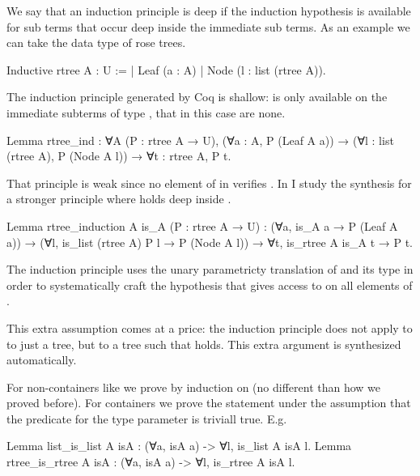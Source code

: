 \documentclass[a4paper, 11pt]{book}
\begin{document}
We say that an induction principle is deep if the induction hypothesis is
available for sub terms that occur deep inside the immediate sub terms.
As an example we can take the data type of rose trees.

\begin{coqcode}
Inductive rtree A : U :=
| Leaf (a : A)
| Node (l : list (rtree A)).
\end{coqcode}

The induction principle generated by Coq is shallow:  is
only available on the immediate subterms of type , that
in this case are none.

\begin{coqcode}
Lemma rtree_ind : ∀A (P : rtree A → U),
  (∀a : A, P (Leaf A a)) →
  (∀l : list (rtree A), P (Node A l)) →
  ∀t : rtree A, P t.
\end{coqcode}

That principle is weak since no element of  in 
verifies . In \cite{tassi:hal-01897468} I study the synthesis
for a stronger principle where  holds deep inside .

\begin{coqcode}
Lemma rtree_induction A is_A (P : rtree A → U) :
  (∀a, is_A a → P (Leaf A a)) →
  (∀l, is_list (rtree A) P l → P (Node A l)) →
     ∀t, is_rtree A is_A t → P t.
\end{coqcode}

The induction principle uses the unary parametricty
translation of  and its type in order to systematically craft
the hypothesis  that gives access to
 on all elements of .

This  extra assumption comes at a price: the induction principle does not apply
to to just a tree, but to a tree  such that
 holds. This extra argument is
synthesized automatically.

For non-containers like 
we prove  by induction on  (no different
than how we proved  before). For containers we prove
the statement under the assumption that the predicate for the type parameter
is triviall true. E.g.

\begin{coqcode}
Lemma list_is_list A isA : (∀a, isA a) -> ∀l, is_list A isA l.
Lemma rtree_is_rtree A isA : (∀a, isA a) -> ∀l, is_rtree A isA l.
\end{coqcode}
\end{document}
